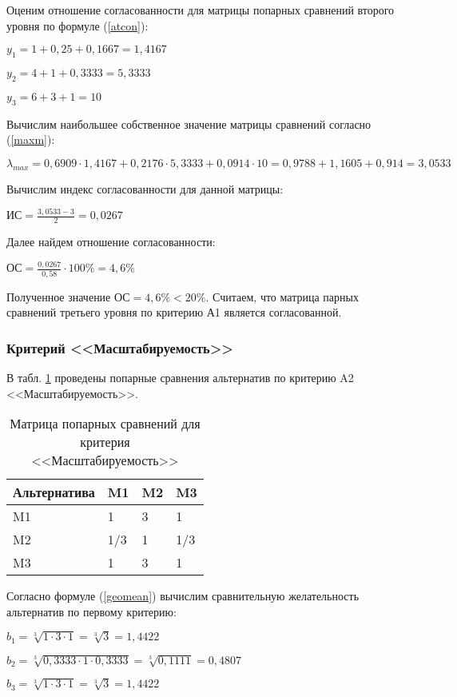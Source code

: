 Оценим отношение согласованности для матрицы попарных сравнений второго уровня по формуле (\ref{atcon}):

$y_1 = 1 + 0,25 + 0,1667 = 1,4167$

$y_2 = 4 + 1 + 0,3333 = 5,3333$

$y_3 = 6 + 3 + 1 = 10$

Вычислим наибольшее собственное значение матрицы сравнений согласно (\ref{maxm}):

$\lambda_{max} = 0,6909 \cdot 1,4167 + 0,2176 \cdot 5,3333 + 0,0914 \cdot 10 = 0,9788 + 1,1605 + 0,914 = 3,0533$

Вычислим индекс согласованности для данной матрицы:

$\text{ИС} = \frac{3,0533 - 3}{2} = 0,0267$

Далее найдем отношение согласованности:

$\text{ОС} = \frac{0,0267}{0,58} \cdot 100\% = 4,6\%$

Полученное значение $\text{ОС} = 4,6\% < 20\%$.
Считаем, что матрица парных сравнений третьего уровня по критерию А1 является согласованной.

\subsubsection{Критерий <<Масштабируемость>>}

В табл. \ref{agil} проведены попарные сравнения альтернатив по критерию A2 <<Масштабируемость>>.
\begin{table}[H]
  \caption{Матрица попарных сравнений для критерия <<Масштабируемость>>}\label{agil}
  \begin{tabular}{|l|l|l|l|}
  \hline Альтернатива & M1 & M2 & M3 \\
  \hline M1 & 1 & 3 & 1 \\
  \hline M2 & 1/3 & 1 & 1/3 \\
  \hline M3 & 1 & 3 & 1 \\
  \hline
  \end{tabular}
\end{table}

Согласно формуле (\ref{geomean}) вычислим сравнительную желательность альтернатив по первому критерию:

$b_1 = \sqrt[3]{1 \cdot 3 \cdot 1} = \sqrt[3]{3} = 1,4422$

$b_2 = \sqrt[3]{0,3333 \cdot 1 \cdot 0,3333} = \sqrt[3]{0,1111} = 0,4807$

$b_3 = \sqrt[3]{1 \cdot 3 \cdot 1} = \sqrt[3]{3} = 1,4422$

